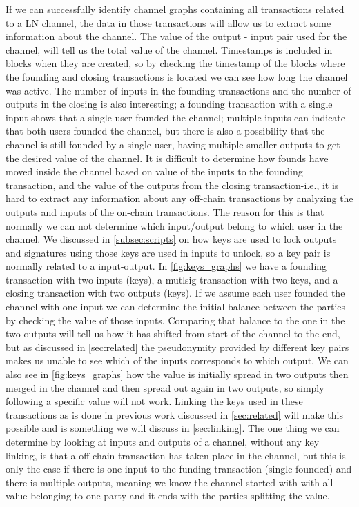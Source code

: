 If we can successfully identify channel graphs containing all transactions related to a LN channel, the data in those transactions will allow us to extract some information about the channel. The value of the output - input pair used for the channel, will tell us the total value of the channel. Timestamps is included in blocks when they are created, so by checking the timestamp of the blocks where the founding and closing transactions is located we can see how long the channel was active. The number of inputs in the founding transactions and the number of outputs in the closing is also interesting; a founding transaction with a single input shows that a single user founded the channel; multiple inputs can indicate that both users founded the channel, but there is also a possibility that the channel is still founded by a single user, having multiple smaller outputs to get the desired value of the channel. It is difficult to determine how founds have moved inside the channel based on value of the inputs to the founding transaction, and the value of the outputs from the closing transaction-i.e., it is hard to extract any information about any off-chain transactions by analyzing the outputs and inputs of the on-chain transactions. The reason for this is that normally we can not determine which input/output belong to which user in the channel. We discussed in \cref{subsec:scripts} on how keys are used to lock outputs and signatures using those keys are used in inputs to unlock, so a key pair is normally related to a input-output. In \cref{fig:keys_graphs} we have a founding transaction with two inputs (keys), a mutlsig transaction with two keys, and a closing transaction with two outputs (keys). If we assume each user founded the channel with one input we can determine the initial balance between the parties by checking the value of those inputs. Comparing that balance to the one in the two outputs will tell us how it has shifted from start of the channel to the end, but as discussed in \cref{sec:related} the pseudonymity provided by different key pairs makes us unable to see which of the inputs corresponds to which output. We can also see in \cref{fig:keys_graphs} how the value is initially spread in two outputs then merged in the channel and then spread out again in two outputs, so simply following a specific value will not work. Linking the keys used in these transactions as is done in previous work discussed in \cref{sec:related} will make this possible and is something we will discuss in \cref{sec:linking}. The one thing we can determine by looking at inputs and outputs of a channel, without any key linking, is that a off-chain transaction has taken place in the channel, but this is only the case if there is one input to the funding transaction (single founded) and there is multiple outputs, meaning we know the channel started with with all value belonging to one party and it ends with the parties splitting the value.

